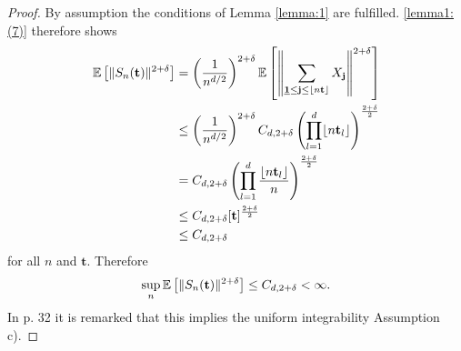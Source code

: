 \begin{proof}
    By assumption the conditions of Lemma \ref{lemma:1} are fulfilled. \eqref{lemma1:(7)} therefore shows
    \begin{align*} 
        \EE{\|S_n(\mathbf{t})\|^{2+\delta}} 
        & = \left(\frac{1}{n^{d/2}}\right)^{2+\delta} \EE{\left\| \sum\limits_{\usbf[1] \leq \mathbf{j} \leq \floor{n \mathbf{t}}} X_\mathbf{j} \right\|^{2+\delta} } \\
        & \leq \left(\frac{1}{n^{d/2}}\right)^{2+\delta} C_{d, 2+\delta} \left(\prod\limits_{l = 1}^d \floor{n \mathbf{t}_l}\right)^{\frac{2+\delta}{2}} \\
        & = C_{d, 2+\delta} \left(\prod\limits_{l = 1}^d \frac{\floor{n \mathbf{t}_l}}{n}\right)^{\frac{2+\delta}{2}} \\
        & \leq C_{d, 2+\delta} [\mathbf{t}]^{\frac{2+\delta}{2}} \\
        & \leq C_{d, 2+\delta}
    \end{align*}
    for all $n$ and $\mathbf{t}$. Therefore
    \[ \sup\limits_n \mathbb{E}\left[\|S_n(\mathbf{t})\|^{2+\delta}\right] \leq C_{d, 2+\delta} < \infty. \]
    In \cite{[4]billingsley1968convergence} p. 32 it is remarked that this implies the uniform integrability Assumption c).


\end{proof}
